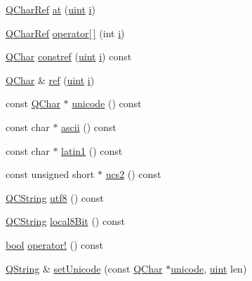 \begin{DoxyCompactItemize}
\item 
\hyperlink{class_q_char_ref}{Q\+Char\+Ref} \hyperlink{class_q_string_a36f6c3019eb2c130513c0bbb6ec8ac35}{at} (\hyperlink{qglobal_8h_a4d3943ddea65db7163a58e6c7e8df95a}{uint} \hyperlink{060__command__switch_8tcl_a8c90afd4641b25be86bd09983c3cbee0}{i})
\item 
\hyperlink{class_q_char_ref}{Q\+Char\+Ref} \hyperlink{class_q_string_a9c1610733a6421ee92252b056a4e9288}{operator\mbox{[}$\,$\mbox{]}} (int \hyperlink{060__command__switch_8tcl_a8c90afd4641b25be86bd09983c3cbee0}{i})
\item 
\hyperlink{class_q_char}{Q\+Char} \hyperlink{class_q_string_ac52fa17f520f38eb68e9000878daa732}{constref} (\hyperlink{qglobal_8h_a4d3943ddea65db7163a58e6c7e8df95a}{uint} \hyperlink{060__command__switch_8tcl_a8c90afd4641b25be86bd09983c3cbee0}{i}) const 
\item 
\hyperlink{class_q_char}{Q\+Char} \& \hyperlink{class_q_string_aeed075cd66817a54e5a2d55ec0e68f4d}{ref} (\hyperlink{qglobal_8h_a4d3943ddea65db7163a58e6c7e8df95a}{uint} \hyperlink{060__command__switch_8tcl_a8c90afd4641b25be86bd09983c3cbee0}{i})
\item 
const \hyperlink{class_q_char}{Q\+Char} $\ast$ \hyperlink{class_q_string_a90243c19cde0be976d0f498db7f7e53a}{unicode} () const 
\item 
const char $\ast$ \hyperlink{class_q_string_a341bdd887362b4298d439355a6c7dd6f}{ascii} () const 
\item 
const char $\ast$ \hyperlink{class_q_string_abcbe2eaebf908efa04c7a6bbec2f78ea}{latin1} () const 
\item 
const unsigned short $\ast$ \hyperlink{class_q_string_a0bf17c41b18b61deb6c47b6e3d3791c8}{ucs2} () const 
\item 
\hyperlink{class_q_c_string}{Q\+C\+String} \hyperlink{class_q_string_a470a105ca0e16b563ddc39ec48d09d6c}{utf8} () const 
\item 
\hyperlink{class_q_c_string}{Q\+C\+String} \hyperlink{class_q_string_a9c83d3dca5da433c1fc5553cabe805eb}{local8\+Bit} () const 
\item 
\hyperlink{qglobal_8h_a1062901a7428fdd9c7f180f5e01ea056}{bool} \hyperlink{class_q_string_a769440ac358c8a0cd14fe80f108cc115}{operator!} () const 
\item 
\hyperlink{class_q_string}{Q\+String} \& \hyperlink{class_q_string_a220282acc5997df4e71e4e3a402bc8c4}{set\+Unicode} (const \hyperlink{class_q_char}{Q\+Char} $\ast$\hyperlink{class_q_string_a90243c19cde0be976d0f498db7f7e53a}{unicode}, \hyperlink{qglobal_8h_a4d3943ddea65db7163a58e6c7e8df95a}{uint} len)

\end{DoxyCompactItemize}
